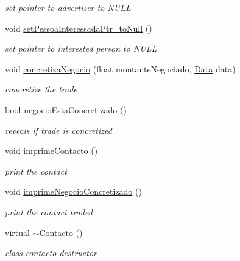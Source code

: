 \begin{DoxyCompactItemize}
\begin{DoxyCompactList}\small\item\em set pointer to advertiser to N\+U\+L\+L \end{DoxyCompactList}\item 
\hypertarget{class_contacto_aadc1fd12d6f93993f47da7a14682a667}{}void \hyperlink{class_contacto_aadc1fd12d6f93993f47da7a14682a667}{set\+Pessoa\+Interessada\+Ptr\+\_\+to\+Null} ()\label{class_contacto_aadc1fd12d6f93993f47da7a14682a667}

\begin{DoxyCompactList}\small\item\em set pointer to interested person to N\+U\+L\+L \end{DoxyCompactList}\item 
void \hyperlink{class_contacto_a6d8d08fbe5dcb7e5a6c5f6e9a4948fe9}{concretiza\+Negocio} (float montante\+Negociado, \hyperlink{class_data}{Data} data)
\begin{DoxyCompactList}\small\item\em concretize the trade \end{DoxyCompactList}\item 
bool \hyperlink{class_contacto_a754f72a858209441e499f78d2a38990d}{negocio\+Esta\+Concretizado} ()
\begin{DoxyCompactList}\small\item\em reveals if trade is concretized \end{DoxyCompactList}\item 
\hypertarget{class_contacto_a8bcc026a54f12e98634655cc9723bfff}{}void \hyperlink{class_contacto_a8bcc026a54f12e98634655cc9723bfff}{imprime\+Contacto} ()\label{class_contacto_a8bcc026a54f12e98634655cc9723bfff}

\begin{DoxyCompactList}\small\item\em print the contact \end{DoxyCompactList}\item 
\hypertarget{class_contacto_ace2a2a384d530518e1e5fb2dd1e8a92c}{}void \hyperlink{class_contacto_ace2a2a384d530518e1e5fb2dd1e8a92c}{imprime\+Negocio\+Concretizado} ()\label{class_contacto_ace2a2a384d530518e1e5fb2dd1e8a92c}

\begin{DoxyCompactList}\small\item\em print the contact traded \end{DoxyCompactList}\item 
\hypertarget{class_contacto_ad4dbabd4cc3502bd8560c23d558e845c}{}virtual \hyperlink{class_contacto_ad4dbabd4cc3502bd8560c23d558e845c}{$\sim$\+Contacto} ()\label{class_contacto_ad4dbabd4cc3502bd8560c23d558e845c}

\begin{DoxyCompactList}\small\item\em class contacto destructor \end{DoxyCompactList}\end{DoxyCompactItemize}
